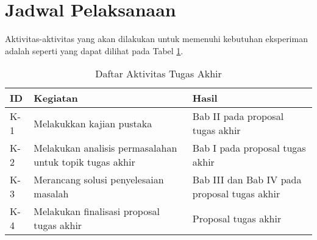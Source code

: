 \section{Jadwal Pelaksanaan}
\label{sec:jadwal-pelaksanaan}
Aktivitas-aktivitas yang akan dilakukan untuk memenuhi kebutuhan eksperiman adalah seperti yang dapat dilihat pada Tabel \ref{tab:rincian-aktivitas}.

\begin{longtable}{|p{1cm}|p{6cm}|p{6cm}|}
	\caption{Daftar Aktivitas Tugas Akhir}
	\label{tab:rincian-aktivitas}                                                                                                                                                                                                                                                                                                                                           \\
	\hline
	\rowcolor{black!10} ID & Kegiatan                                                                                                                                                        & Hasil                                                                                                                                                                        \\ \hline
	K-1                    & Melakukkan kajian pustaka                                                                                                                                       & Bab II pada proposal tugas akhir                                                                                                                                             \\ \hline
	K-2                    & Melakukan analisis permasalahan untuk topik tugas akhir                                                                                                         & Bab I pada proposal tugas akhir                                                                                                                                              \\ \hline
	K-3                    & Merancang solusi penyelesaian masalah                                                                                                                           & Bab III dan Bab IV pada proposal tugas akhir                                                                                                                                 \\ \hline
	K-4                    & Melakukan finalisasi proposal tugas akhir                                                                                                                       & Proposal tugas akhir                                                                                                                                                         \\ \hline

\end{longtable}
